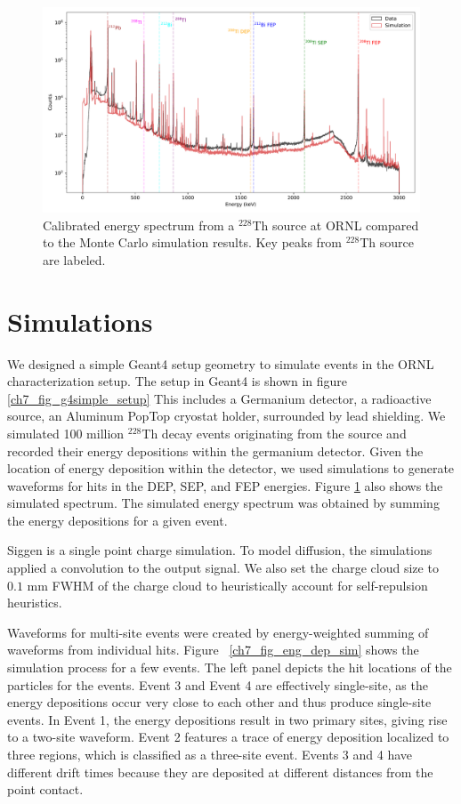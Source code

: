 \begin{figure}%
\centering
    \includegraphics[width=0.99\linewidth,trim={0pc 0pc 0pc 0pc},clip]{ch7/figs/energy_spectrum_comparison.pdf}
    \caption{Calibrated energy spectrum from a $^{228}$Th source at ORNL compared to the Monte Carlo simulation results. Key peaks from $^{228}$Th source are labeled.}
   \label{ch7_fig_eng_spec_comp}
\end{figure}

\section{Simulations}
We designed a simple Geant4 setup geometry to simulate events in the ORNL characterization setup. The setup in Geant4 is shown in figure \ref{ch7_fig_g4simple_setup} This includes a Germanium detector, a radioactive source, an Aluminum PopTop cryostat holder, surrounded by lead shielding. We simulated 100 million $^{228}$Th decay events originating from the source and recorded their energy depositions within the germanium detector. Given the location of energy deposition within the detector, we used {\siggen} simulations to generate waveforms for hits in the DEP, SEP, and FEP energies. Figure \ref{ch7_fig_eng_spec_comp} also shows the simulated spectrum. The simulated energy spectrum was obtained by summing the energy depositions for a given event.

Siggen is a single point charge simulation. To model diffusion, the simulations applied a convolution to the output signal. We also set the charge cloud size to $0.1$ mm FWHM of the charge cloud to heuristically account for self-repulsion heuristics.

Waveforms for multi-site events were created by energy-weighted summing of waveforms from individual hits. Figure ~\ref{ch7_fig_eng_dep_sim} shows the simulation process for a few events. The left panel depicts the hit locations of the particles for the events. Event 3 and Event 4 are effectively single-site, as the energy depositions occur very close to each other and thus produce single-site events. In Event 1, the energy depositions result in two primary sites, giving rise to a two-site waveform. Event 2 features a trace of energy deposition localized to three regions, which is classified as a three-site event. Events 3 and 4 have different drift times because they are deposited at different distances from the point contact.

